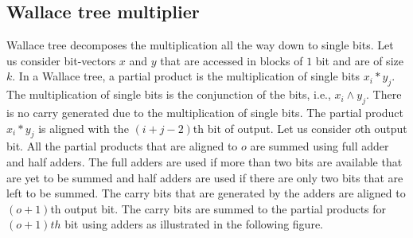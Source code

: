 \subsection{Wallace tree multiplier}
%
Wallace tree\cite{wallace} decomposes the multiplication all the way down to single bits.
%
Let us consider bit-vectors $x$ and $y$ that are accessed in  blocks of $1$
bit and are of size $k$.
%
In a Wallace tree, a partial product is the multiplication of single
bits $x_i*y_j$.
%
The multiplication of single bits is the conjunction of the bits, i.e.,
$x_i \land y_j$.
%
There is no carry generated due to the multiplication of single bits.
%
The partial product $x_i*y_j$ is aligned with the $(i+j-2)$th bit of output.
%
Let us consider $o$th output bit.
%
All the partial products that are aligned to $o$ are summed using full adder 
and half adders.
%
The full adders are used
if more than two bits are available that are yet to be summed
and half adders are used if there are only two bits that are left to be summed.
%
The carry bits that are generated by the adders are aligned to
$(o+1)$th output bit.
%
The carry bits are summed to the partial products for $(o+1)th$ bit
using adders as illustrated in the following figure.

\begin{center}
\end{center}

